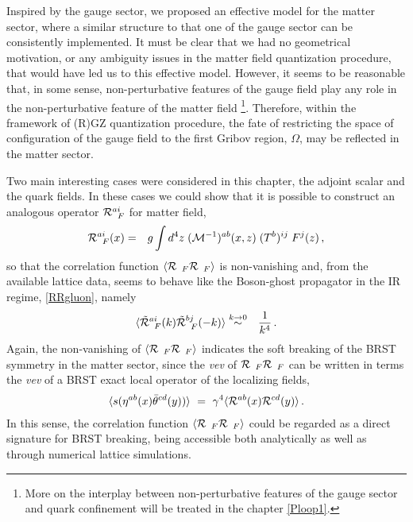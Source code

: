 Inspired by the gauge sector, we proposed an effective model for the matter sector, where a
similar structure to that one of the gauge sector can be consistently implemented. It must be
clear that we had no geometrical motivation, or any ambiguity issues in the matter field
quantization procedure, that would have led us to this effective model. However, it seems to be
reasonable that, in some sense, non-perturbative features of the gauge field play any role in
the non-perturbative feature of the matter field \footnote{More on the interplay between
non-perturbative features of the gauge sector and quark confinement will be treated in the
chapter \ref{Ploop1}.}. Therefore, within the framework of (R)GZ quantization procedure, the
fate of restricting the space of configuration of the gauge field to the first Gribov region,
$\Omega$, may be reflected in the matter sector.

Two main interesting cases were considered in this chapter, the adjoint scalar and the quark
fields. In these cases we could show that it is possible to construct an analogous operator ${\cal
R}^{ai}_{\;\;F}$ for matter field,
\begin{eqnarray}
{\cal R}^{ai}_{\;\;F}(x)  &=&  g \int d^4z\;  ({\cal M}^{-1})^{ab} (x,z)   \;(T^b)^{ij}
\;F^{j}(z)  
\,,
\end{eqnarray}
so that the correlation function $\langle{\cal R}_{\;\;F}{\cal R}_{\;\;F}\rangle$ is
non-vanishing and, from the available lattice data, seems to behave like the Boson-ghost
propagator in the IR regime, \eqref{RRgluon}, namely
\begin{eqnarray}
\langle \tilde {\cal R}^{ai}_{\;\;F}(k)\tilde {\cal R}^{bj}_{\;\;F}(-k)\rangle&\stackrel{k\to 0}{\sim}&\frac{1}{k^4} 
\,.
\end{eqnarray}
Again, the non-vanishing of $\langle{\cal R}_{\;\;F}{\cal R}_{\;\;F}\rangle$ indicates the soft
breaking of the BRST symmetry in the matter sector, since the \emph{vev} of ${\cal
R}_{\;\;F}{\cal R}_{\;\;F}$ can be written in terms the \emph{vev} of a BRST exact local
operator of the localizing fields,
\begin{eqnarray}
\langle s(\eta^{ab}(x)\bar{\theta}^{cd}(y))  \rangle ~=~ \gamma^{4} \langle
{\cal R}^{ab}(x) {\cal R}^{cd}(y)\rangle\,.
\end{eqnarray}
In this sense, the correlation function $\langle{\cal R}_{\;\;F}{\cal R}_{\;\;F}\rangle$ could
be regarded as a direct signature for BRST breaking, being accessible both analytically as well
as through numerical lattice simulations. 

